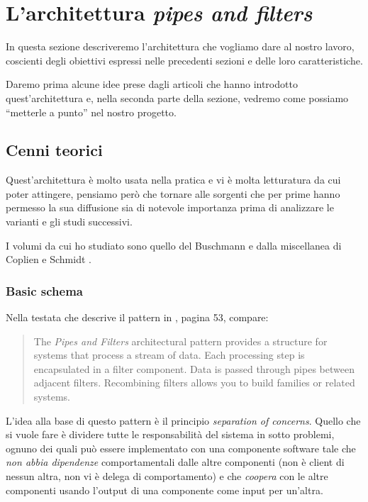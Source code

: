 \section{L'architettura \emph{pipes and filters}}

In questa sezione descriveremo l'architettura che vogliamo dare al
nostro lavoro, coscienti degli obiettivi espressi nelle precedenti
sezioni e delle loro caratteristiche.

Daremo prima alcune idee prese dagli articoli che hanno introdotto
quest'architettura e, nella seconda parte della sezione, vedremo come
possiamo ``metterle a punto'' nel nostro progetto.

\subsection{Cenni teorici}
Quest'architettura \`e molto usata nella pratica e vi \`e molta
letturatura da cui poter attingere, pensiamo per\`o che tornare alle
sorgenti che per prime hanno permesso la sua diffusione sia di
notevole importanza prima di analizzare le varianti e gli studi
successivi.

I volumi da cui ho studiato sono quello del Buschmann \cite{POSA} e
dalla miscellanea di Coplien e Schmidt \cite{PLOPD}.

\subsubsection{Basic schema}
Nella testata che descrive il pattern in \cite{POSA}, pagina 53,
compare:
\begin{quotation}
  The \emph{Pipes and Filters} architectural pattern provides a
  structure for systems that process a stream of data. Each processing
  step is encapsulated in a filter component. Data is passed through
  pipes between adjacent filters. Recombining filters allows you to
  build families or related systems.
\end{quotation}
L'idea alla base di questo pattern \`e il principio \emph{separation
  of concerns}. Quello che si vuole fare \`e dividere tutte le
responsabilit\`a del sistema in sotto problemi, ognuno dei quali pu\`o
essere implementato con una componente software tale che \emph{non
  abbia dipendenze} comportamentali dalle altre componenti (non \`e
client di nessun altra, non vi \`e delega di comportamento) e che
\emph{coopera} con le altre componenti usando l'output di una
componente come input per un'altra.

